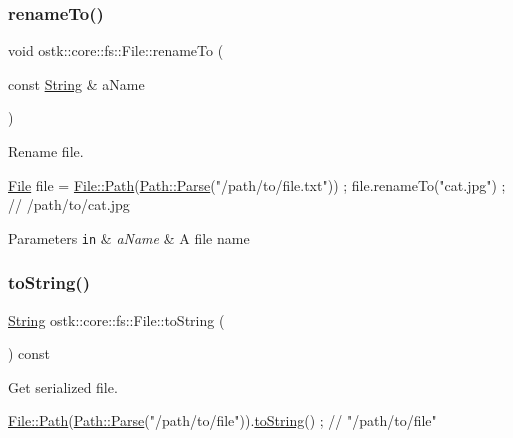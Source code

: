 \subsubsection{\texorpdfstring{rename\+To()}{renameTo()}}
{\footnotesize\ttfamily void ostk\+::core\+::fs\+::\+File\+::rename\+To (\begin{DoxyParamCaption}\item[{const \hyperlink{classostk_1_1core_1_1types_1_1_string}{String} \&}]{a\+Name }\end{DoxyParamCaption})}



Rename file. 


\begin{DoxyCode}
\hyperlink{classostk_1_1core_1_1fs_1_1_file_ad1695224996950be9962b8457da369b3}{File} file = \hyperlink{classostk_1_1core_1_1fs_1_1_file_ad677c6a3edc1e88c18226edebff1da03}{File::Path}(\hyperlink{classostk_1_1core_1_1fs_1_1_path_ad08539ba654f5df11c4bcb07276345ad}{Path::Parse}(\textcolor{stringliteral}{"/path/to/file.txt"})) ;
file.renameTo(\textcolor{stringliteral}{"cat.jpg"}) ; \textcolor{comment}{// /path/to/cat.jpg}
\end{DoxyCode}



\begin{DoxyParams}[1]{Parameters}
\mbox{\tt in}  & {\em a\+Name} & A file name \\
\hline
\end{DoxyParams}
\mbox{\label{classostk_1_1core_1_1fs_1_1_file_af3fc4659467e9eba1a7faff578abdbab}} 
\subsubsection{\texorpdfstring{to\+String()}{toString()}}
{\footnotesize\ttfamily \hyperlink{classostk_1_1core_1_1types_1_1_string}{String} ostk\+::core\+::fs\+::\+File\+::to\+String (\begin{DoxyParamCaption}{ }\end{DoxyParamCaption}) const}



Get serialized file. 


\begin{DoxyCode}
\hyperlink{classostk_1_1core_1_1fs_1_1_file_ad677c6a3edc1e88c18226edebff1da03}{File::Path}(\hyperlink{classostk_1_1core_1_1fs_1_1_path_ad08539ba654f5df11c4bcb07276345ad}{Path::Parse}(\textcolor{stringliteral}{"/path/to/file"})).\hyperlink{classostk_1_1core_1_1fs_1_1_file_af3fc4659467e9eba1a7faff578abdbab}{toString}() ; \textcolor{comment}{// "/path/to/file"}
\end{DoxyCode}


